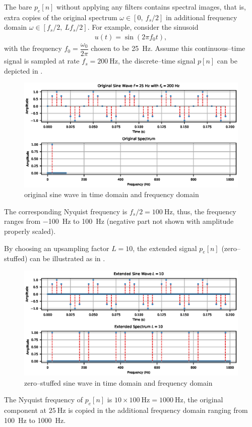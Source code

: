 The bare $p_e[n]$ without applying any filters contains spectral images, that is, extra copies of the original spectrum $\omega\in[0,~f_s/2]$ in additional frequency domain $\omega\in[f_s/2,~Lf_s/2]$. For example, consider the sinusoid
\begin{gather}
u(t)=\sin\left(2\pi{}f_0t\right),
\end{gather}
with the frequency $f_0=\dfrac{\omega_0}{2\pi}$ chosen to be \SI{25}{\hertz}. Assume this continuous--time signal is sampled at rate $f_s=\SI{200}{\hertz}$, the discrete--time signal $p[n]$ can be depicted in .
\begin{figure}[H]
\centering
\includegraphics{PIC/PureSineOrigin}
\caption{original sine wave in time domain and frequency domain}\label{fig:original}
\end{figure}
The corresponding Nyquist frequency is $f_s/2=\SI{100}{\hertz}$, thus, the frequency ranges from \SI{-100}{\hertz} to \SI{100}{\hertz} (negative part not shown with amplitude properly scaled).

By choosing an upsampling factor $L=10$, the extended signal $p_e[n]$ (zero--stuffed) can be illustrated as in .
\begin{figure}[H]
\centering
\includegraphics{PIC/PureSineExtended}
\caption{zero--stuffed sine wave in time domain and frequency domain}\label{fig:extended}
\end{figure}
The Nyquist frequency of $p_e[n]$ is $10\times\SI{100}{\hertz}=\SI{1000}{\hertz}$, the original component at $\SI{25}{\hertz}$ is copied in the additional frequency domain ranging from \SI{100}{\hertz} to \SI{1000}{\hertz}.

